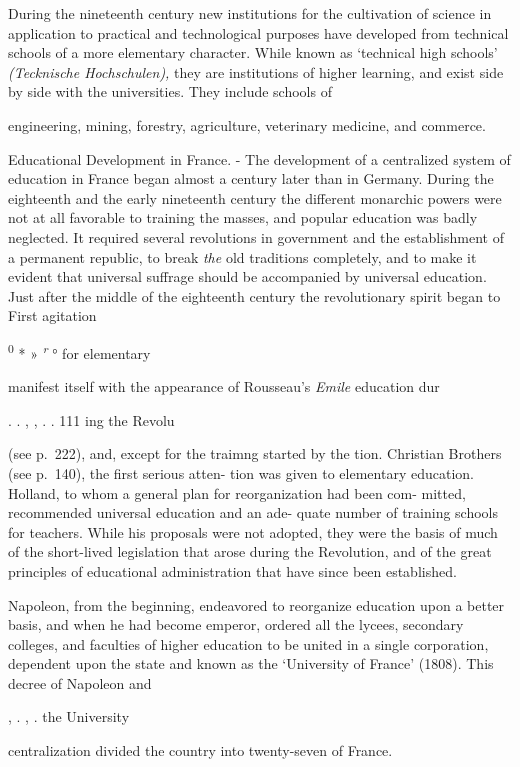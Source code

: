 \documentclass[
]{book}
\begin{document}
During the nineteenth century new institutions for the cultivation of science in application to practical and technological purposes have developed from technical schools of a more elementary character. While known as `technical high schools' \emph{(Tecknische Hochschulen),} they are institutions of higher learning, and exist side by side with the universities. They include schools of

engineering, mining, forestry, agriculture, veterinary medicine, and commerce.

Educational Development in France. - The development of a centralized system of education in France began almost a century later than in Germany. During the eighteenth and the early nineteenth century the different monarchic powers were not at all favorable to training the masses, and popular education was badly neglected. It required several revolutions in government and the establishment of a permanent republic, to break \emph{the} old traditions completely, and to make it evident that universal suffrage should be accompanied by universal education. Just after the middle of the eighteenth century the revolutionary spirit began to First agitation

\textsuperscript{0} * » \emph{\textsuperscript{r}} ° for elementary

manifest itself with the appearance of Rousseau's \emph{Emile} education dur

. . , , . . 111 ing the Revolu

(see p.~222), and, except for the traimng started by the tion. Christian Brothers (see p.~140), the first serious atten- tion was given to elementary education. Holland, to whom a general plan for reorganization had been com- mitted, recommended universal education and an ade- quate number of training schools for teachers. While his proposals were not adopted, they were the basis of much of the short-lived legislation that arose during the Revolution, and of the great principles of educational administration that have since been established.

Napoleon, from the beginning, endeavored to reorganize education upon a better basis, and when he had become emperor, ordered all the lycees, secondary colleges, and faculties of higher education to be united in a single corporation, dependent upon the state and known as the `University of France' (1808). This decree of Napoleon and

, . , . the University

centralization divided the country into twenty-seven of France.
\end{document}
